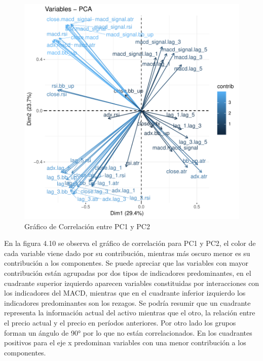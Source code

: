 \documentclass[a4paper,12pt]{Latex/Classes/PhDthesisPSnPDF}
\begin{document}
\begin{figure}[H]
\centering
\includegraphics{main-016}
\caption{Gráfico de Correlación entre PC1 y PC2}
\end{figure}

En la figura 4.10 se observa el gráfico de correlación para PC1 y PC2, el color de cada variable viene dado por su contribución, mientras más oscuro menor es su contribución a los componentes. Se puede apreciar que las variables con mayor contribución están agrupadas por dos tipos de indicadores predominantes, en el cuadrante superior izquierdo aparecen variables constituidas por interacciones con los indicadores del MACD, mientras que en el cuadrante inferior izquierdo los indicadores predominantes son los rezagos. Se podría resumir que un cuadrante representa la información actual del activo mientras que el otro, la relación entre el precio actual y el precio en períodos anteriores. Por otro lado los grupos forman un ángulo de 90° por lo que no están correlacionados. En los cuadrantes positivos para el eje x predominan variables con una menor contribución a los componentes.
\end{document}
